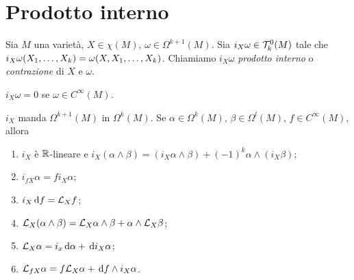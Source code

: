 \section{Prodotto interno}
\begin{definition}
	Sia $M$ una varietà, $X\in\chi(M)$, $\omega\in\Omega^{k+1}(M)$. Sia $i_X\omega \in \Tau_k^0(M)$ tale che $i_X\omega(\seqb Xk,) = \omega(X,\seqb Xk,)$. Chiamiamo $i_X\omega$ \emph{prodotto interno} o \emph{contrazione} di $X$ e $\omega$.
\end{definition}

\begin{remark}
	$i_X\omega = 0$ se $\omega\in C^\infty(M)$.
\end{remark}

\begin{theorem} \label{thm:ProprietaProdottoInterno}
	$i_X$ manda $\Omega^{k+1}(M)$ in $\Omega^k(M)$. Se $\alpha\in\Omega^k(M)$, $\beta\in\Omega^l(M)$, $f\in C^\infty(M)$, allora
	\begin{enumerate}
		\item $i_X$ è $\R$-lineare e $i_X(\alpha\wedge\beta) = (i_X\alpha\wedge \beta) + (-1)^k \alpha \wedge (i_X\beta)$;
		\item $i_{fX}\alpha = f i_X\alpha$;
		\item $i_X\de f = \Lie_X f$;
		\item $\Lie_X(\alpha\wedge\beta) = \Lie_X \alpha \wedge \beta + \alpha \wedge \Lie_X \beta$;
		\item $\Lie_X \alpha = i_x \de\alpha + \de i_X\alpha$;
		\item $\Lie_{fX}\alpha = f\Lie_X\alpha + \de f \wedge i_X\alpha$.
	\end{enumerate}
\end{theorem}
